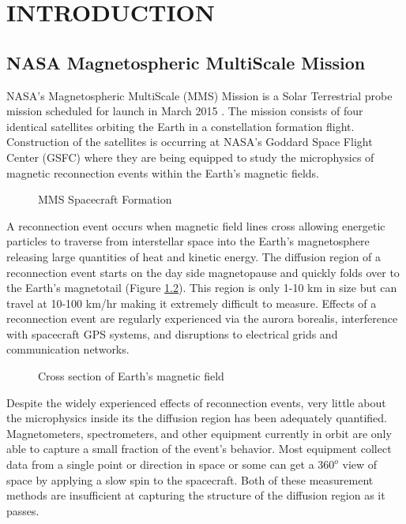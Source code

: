 

\chapter{INTRODUCTION}
\label{chap:Introduction}

\section{NASA Magnetospheric MultiScale Mission}
\label{sec:NASAMagnetosphericMultiScaleMission}

NASA's Magnetospheric MultiScale (MMS) Mission is a Solar Terrestrial probe mission scheduled for launch in March 2015 \cite{mms_website}.  The mission consists of four identical satellites orbiting the Earth in a constellation formation flight.  Construction of the satellites is occurring at NASA's Goddard Space Flight Center (GSFC) where they are being equipped to study the microphysics of magnetic reconnection events within the Earth's magnetic fields.

\begin{figure}[H]
  \centerline{}
  \caption{MMS Spacecraft Formation \cite{mms_website}}
  \label{fig:spacecraft_formation}
\end{figure}

A reconnection event occurs when magnetic field lines cross allowing energetic particles to traverse from interstellar space into the Earth's magnetosphere releasing large quantities of heat and kinetic energy.  The diffusion region of a reconnection event starts on the day side magnetopause and quickly folds over to the Earth's magnetotail (Figure \ref{fig:magneticfields}).  This region is only 1-10 km in size but can travel at 10-100 km/hr \cite{swri} making it extremely difficult to measure.  Effects of a reconnection event are regularly experienced via the aurora borealis, interference with spacecraft GPS systems, and disruptions to electrical grids and communication networks.

\begin{figure}[H]
  \centerline{}
  \caption{Cross section of Earth's magnetic field \cite{mms_website}}
  \label{fig:magneticfields}
\end{figure}

Despite the widely experienced effects of reconnection events, very little about the microphysics inside its the diffusion region has been adequately quantified.  Magnetometers, spectrometers, and other equipment currently in orbit are only able to capture a small fraction of the event's behavior.  Most equipment collect data from a single point or direction in space or some can get a $360^o$ view of space by applying a slow spin to the spacecraft.  Both of these measurement methods are insufficient at capturing the structure of the diffusion region as it passes.

